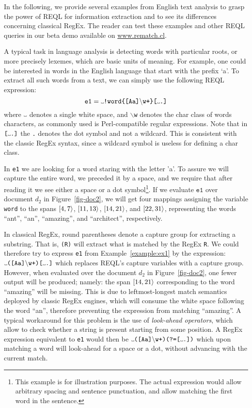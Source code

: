 In the following, we provide several examples from English text analysis to grasp the power of REQL for information extraction and to see its differences concerning classical RegEx. The reader can test these examples and other REQL queries in our \rematch{} beta demo available on \url{www.rematch.cl}.
\begin{example}\label{example:ex1}
A typical task in language analysis is detecting words with particular roots, or more precisely lexemes, which are basic units of meaning. For example, one could be interested in words in the English language that start with the prefix `a'. To extract all such words from a text, we can simply use the following REQL expression:
$$
\texttt{e1} = \Vtextvisiblespace \texttt{!word\{[Aa]}\backslash \texttt{w+\}[}\Vtextvisiblespace \texttt{.]}
$$
\noindent
where $\Vtextvisiblespace$ denotes a single white space, and $\backslash$\texttt{w} denotes the char class of words characters, as commonly used is Perl-compatible regular expressions. Note that in $\texttt{[}\Vtextvisiblespace \texttt{.]}$ the \texttt{.} denotes the dot symbol and not a wildcard. This is consistent with the classic RegEx syntax, since a wildcard symbol is useless for defining a char class.

In \texttt{e1} we are looking for a word staring with the letter 'a'. To assure we will capture the entire word, we preceded it by a space, and we require that after reading it we see either a space or a dot symbol\footnote{This example is for illustration purposes. The actual expression would allow arbitrary spacing and sentence punctuation, and allow matching the first word in the sentence.}. If we evaluate $\texttt{e1}$ over document $d_2$ in Figure~\ref{fig-doc2}, we will get four mappings assigning the variable \texttt{word} to the spans $[4, 7\rangle$, $[11, 13\rangle$, $[14, 21\rangle$, and $[22, 31\rangle$, representing the words ``ant'', ``an'', ``amazing'', and ``architect'', respectively.
\end{example}
In classical RegEx, round parentheses denote a capture group for extracting a substring. That is,  \texttt{(R)} will extract what is matched by the RegEx \texttt{R}. We could therefore try to express \texttt{e1} from Example~\ref{example:ex1} by the expression: $\Vtextvisiblespace \texttt{([Aa]}\backslash \texttt{w+)[}\Vtextvisiblespace \texttt{.]}$ which replaces REQL's capture variables with a capture group. However, when evaluated over the document $d_2$ in Figure~\ref{fig-doc2}, one fewer output will be produced; namely: the span $[14, 21\rangle$ corresponding to the word ``amazing'' will be missing. This is due to leftmost-longest match semantics deployed by classic RegEx engines, which will consume the white space following the word ``an'', therefore preventing the expression from matching ``amazing''. A typical workaround for this problem is the use of \emph{look-ahead operators}, which allow to check whether a string is present starting from some position. A RegEx expression equivalent to \texttt{e1} would then be $\Vtextvisiblespace \texttt{([Aa]}\backslash \texttt{w+)(?=[}\Vtextvisiblespace \texttt{.])}$ which upon matching a word will look-ahead for a space or a dot, without advancing with the current match. 
